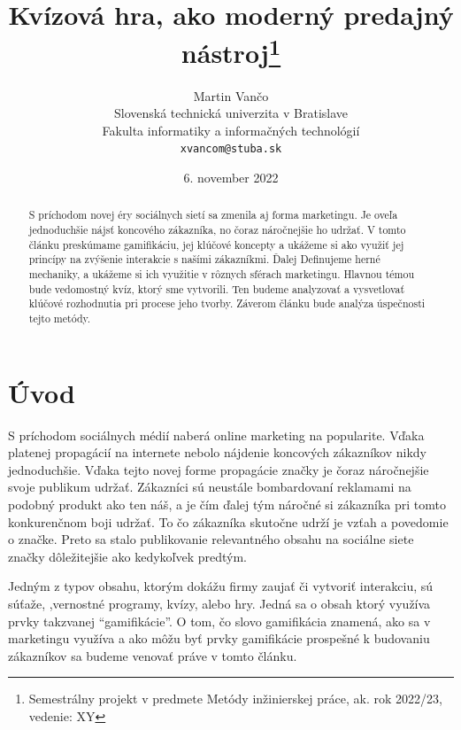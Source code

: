 \documentclass[10pt,twoside,slovak,a4paper]{article}
\title{Kvízová hra, ako moderný predajný nástroj\thanks{Semestrálny projekt v predmete Metódy inžinierskej práce, ak. rok 2022/23, vedenie: XY}}
\author{Martin Vančo\\[2pt]
	{\small Slovenská technická univerzita v Bratislave}\\
	{\small Fakulta informatiky a informačných technológií}\\
	{\small \texttt{xvancom@stuba.sk}}
}
\date{\small 6. november 2022}
\begin{document}
\maketitle

\begin{abstract}
	S príchodom novej éry sociálnych sietí sa zmenila aj forma marketingu. Je oveľa jednoduchšie nájsť koncového zákazníka, no čoraz náročnejšie ho udržať. V tomto článku preskúmame gamifikáciu, jej klúčové koncepty a ukážeme si ako využiť jej princípy na zvýšenie interakcie s našími zákazníkmi. Ďalej Definujeme herné mechaniky, a ukážeme si ich využitie v rôznych sférach marketingu. Hlavnou témou bude vedomostný kvíz, ktorý sme vytvorili. Ten budeme analyzovať a vysvetlovať klúčové rozhodnutia pri procese jeho tvorby. Záverom článku bude analýza úspečnosti tejto metódy.
\end{abstract}
\clearpage

\section{Úvod}\label{uvod}

	S príchodom sociálnych médií naberá online marketing na popularite. Vďaka platenej propagácií na internete nebolo nájdenie koncových zákazníkov nikdy jednoduchšie. Vďaka tejto novej forme propagácie značky je čoraz náročnejšie svoje publikum udržať. Zákazníci sú neustále bombardovaní reklamami na podobný produkt ako ten náš, a je čím ďalej tým náročné si zákazníka pri tomto konkurenčnom boji udržať. To čo zákazníka skutočne udrží je vzťah a povedomie o značke. Preto sa stalo publikovanie relevantného obsahu na sociálne siete značky dôležitejšie ako kedykoľvek predtým.
	
	Jedným z typov obsahu, ktorým dokážu firmy zaujať či vytvoriť interakciu, sú súťaže, ,vernostné programy, kvízy, alebo hry. Jedná sa o obsah ktorý využíva prvky takzvanej “gamifikácie”. O tom, čo slovo gamifikácia znamená, ako sa v marketingu využíva a ako môžu byť prvky gamifikácie prospešné k budovaniu zákazníkov sa budeme venovať práve v tomto článku.
\end{document}
